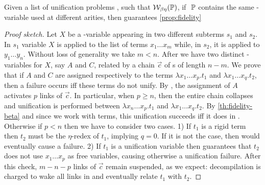 \begin{theorem}
  Given a list of unification problems \foUnifPb, such that 
  $\mathcal{W}_{\beta \eta}(\mathbb{P})$,
  if $\ \mathbb{P}$ contains the same \Fo{}-variable used at different arities,
  then \mapdeduplication guarantees \cref{prop:fidelity}
\end{theorem}

\begin{proof}[Proof sketch]
  Let $X$ be a \Fo{}-variable appearing in two different subterms $s_1$ and $s_2$.
  In $s_1$ variable $X$ is applied to the list of terms $x_1\dots x_m$ while, in $s_2$,
  it is applied to $y_1\dots y_n$. Without loss of generality we take $m < n$.
  After \mapdeduplication we have two distinct \Ho{}-variables for $X$, say $A$ and $C$,
  related by a chain $\vec{c}$ of \linketa{}s of length $n - m$. We prove that
  if $A$ and $C$ are assigned respectively to the \wellb terms $\lambda x_1\dots
  x_p.t_1$ and $\lambda x_1\dots x_q.t_2$, then a failure occurs iff
  these terms do not unify. By \progressetaleft, the assignment of $A$
  activates $p$ links of $\vec{c}$. In particular, when $p \geq n$, then the entire
  chain collapses and unification is performed between $\lambda x_n\dots
  x_p.t_1$ and $\lambda x_1\dots x_q.t_2$. By \cref{th:fidelity-beta} and since
  we work with \wellb terms, this unification succeeds iff it does in \Fo.
  Otherwise if $p < n$ then we have to consider two cases. 1) If $t_1$ is a rigid
  term then $t_2$ must be the $\eta$-redex of $t_1$, implying $q = 0$. If it
  is not the case, then \progressetaleft
  would eventually cause a failure. 2) If $t_1$ is a
  unification variable then  guarantees that $t_2$ does not use
  $x_1\dots x_p$ as free variables, causing otherwise a unification failure.
  After this check, $m - n - p$ links of $\vec{c}$ remain suspended, as we expect:
  decompilation is charged to wake all links in \linkStore and eventually relate
  $t_1$ with $t_2$.

\end{proof}
